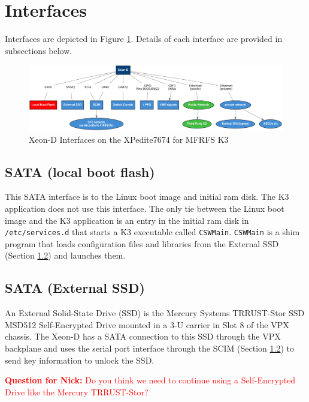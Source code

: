 \documentclass[12pt]{article}
\begin{document}
\section{Interfaces}

Interfaces are depicted in Figure \ref{fig:inteface}.  Details of each
interface are provided in subsections below.

\begin{figure}[H]
\begin{center}
\includegraphics[width=1.0\textwidth]{img/interface}
\caption{Xeon-D Interfaces on the XPedite7674 for MFRFS K3}
\label{fig:inteface}
\end{center}
\end{figure}



\subsection{SATA (local boot flash)}
\label{section:sata}

This SATA interface is to the Linux boot image and initial ram disk.
The K3 application does not use this interface.
The only tie between the Linux boot image and the K3 application is 
an entry in the initial ram disk in \texttt{/etc/services.d} that
starts a K3 executable called \texttt{CSWMain}.
\texttt{CSWMain} is a shim program that loads configuration files
and libraries from the External SSD (Section \ref{section:sata2}) and
launches them.



\subsection{SATA (External SSD)}
\label{section:sata2}

An External Solid-State Drive (SSD) is the Mercury Systems TRRUST-Stor SSD MSD512 Self-Encrypted Drive mounted in a 3-U carrier in Slot 8 of the VPX chassis.  The Xeon-D has a SATA connection to this SSD through the VPX backplane and uses the serial port interface through the SCIM (Section \ref{section:sata2}) to send key information to unlock the SSD. 
\vspace{0.8cm}

\textcolor{red}{\textbf{Question for Nick:} Do you think we need to
continue using a Self-Encrypted Drive like the Mercury TRRUST-Stor?}

\end{document}
